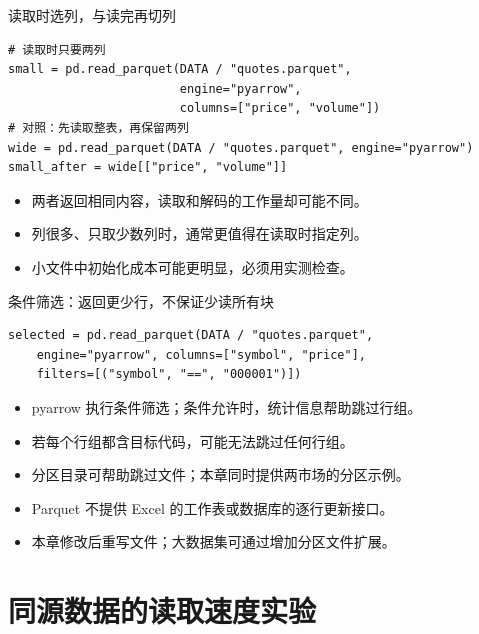 \documentclass[9pt]{ctexbeamer}
\begin{document}
\begin{frame}[fragile]{读取时选列，与读完再切列}
\begin{lstlisting}
# 读取时只要两列
small = pd.read_parquet(DATA / "quotes.parquet",
                        engine="pyarrow",
                        columns=["price", "volume"])
# 对照：先读取整表，再保留两列
wide = pd.read_parquet(DATA / "quotes.parquet", engine="pyarrow")
small_after = wide[["price", "volume"]]
\end{lstlisting}
\begin{itemize}
\item 两者返回相同内容，读取和解码的工作量却可能不同。
\item 列很多、只取少数列时，通常更值得在读取时指定列。
\item 小文件中初始化成本可能更明显，必须用实测检查。
\end{itemize}
\end{frame}

\begin{frame}[fragile]{条件筛选：返回更少行，不保证少读所有块}
\begin{lstlisting}
selected = pd.read_parquet(DATA / "quotes.parquet",
    engine="pyarrow", columns=["symbol", "price"],
    filters=[("symbol", "==", "000001")])
\end{lstlisting}
\begin{itemize}
\item pyarrow 执行条件筛选；条件允许时，统计信息帮助跳过行组。
\item 若每个行组都含目标代码，可能无法跳过任何行组。
\item 分区目录可帮助跳过文件；本章同时提供两市场的分区示例。
\item Parquet 不提供 Excel 的工作表或数据库的逐行更新接口。
\item 本章修改后重写文件；大数据集可通过增加分区文件扩展。
\end{itemize}
\end{frame}

\section{同源数据的读取速度实验}
\end{document}

